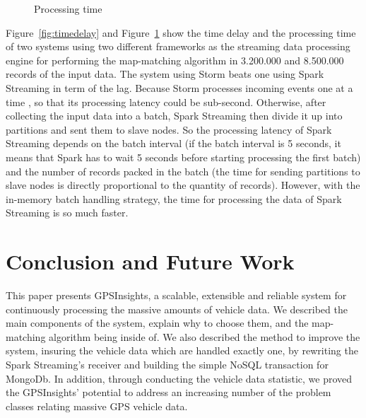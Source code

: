 \documentclass{acm_proc_article-sp}
\begin{document}
	\begin{figure}[h]
		\centering
		\caption{Processing time}
		\label{fig:processingtime}
	\end{figure}
	
Figure~\ref{fig:timedelay} and Figure~\ref{fig:processingtime} show the time delay and the processing time of two systems using two different frameworks as the streaming data processing engine for performing the map-matching algorithm in 3.200.000 and 8.500.000 records of the input data. The system using Storm beats one using Spark Streaming in term of the lag. Because Storm processes incoming events one at a time , so that its processing latency could be sub-second. Otherwise, after collecting the input data into a batch, Spark Streaming then divide it up into partitions and sent them to slave nodes. So the processing latency of Spark Streaming depends on the batch interval (if the batch interval is 5 seconds, it means that Spark has to wait 5 seconds before starting processing the first batch)  and the number of records packed in the batch (the time for sending partitions to slave nodes is directly proportional to the quantity of records). However, with the in-memory batch handling strategy, the time for processing the data of Spark Streaming is so much faster.	
	

			
\section{Conclusion and Future Work}
This paper presents GPSInsights, a scalable, extensible and reliable system for continuously processing the massive amounts of vehicle data. We described the main components of the system, explain why to choose them, and the map-matching algorithm being inside of. We also described the method to improve the system, insuring the vehicle data which are handled exactly one, by rewriting the Spark Streaming's receiver and building the simple NoSQL transaction for MongoDb. In addition, through conducting the vehicle data statistic, we proved the GPSInsights' potential to address an increasing number of the problem classes relating massive GPS vehicle data.
\end{document}
